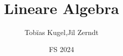 \documentclass[a4paper, fontsize = 8pt, landscape]{scrartcl}
\title{Lineare Algebra}
\author{Tobïas Kugel,Jil Zerndt}
\date{FS 2024}
\begin{document}
\begin{multicols*}{3}
    \thispagestyle{TitlePageStyle}
		\maketitle
    
    \raggedcolumns
    
    \raggedcolumns
    \newpage
    
    \raggedcolumns
    
    \raggedcolumns
    
    \raggedcolumns
    
    \raggedcolumns
    
    

\end{multicols*}
\end{document}
